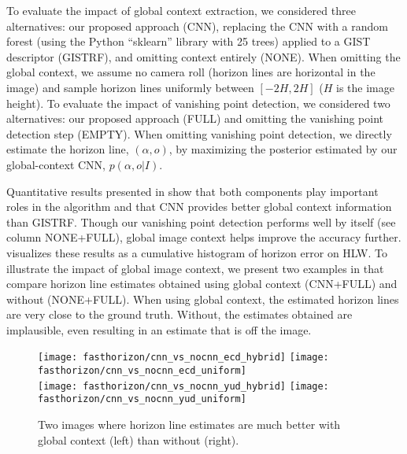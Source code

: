 To evaluate the impact of global context extraction, we considered
three alternatives: our proposed approach (CNN), replacing the CNN
with a random forest (using the Python ``sklearn'' library with 25 trees) applied to a GIST~\cite{oliva2001modeling}
descriptor (GISTRF), and omitting context entirely
(NONE). When omitting the global context, we assume no camera
roll (horizon lines are horizontal in the image) and sample horizon
lines uniformly between $[-2H,2H]$ ($H$ is the image height).  To
evaluate the impact of vanishing point detection, we considered two
alternatives: our proposed approach (FULL) and omitting the vanishing
point detection step (EMPTY). When omitting vanishing point detection,
we directly estimate the horizon line, $(\alpha, o)$, by maximizing
the posterior estimated by our global-context CNN, $p(\alpha, o | I)$.

Quantitative results presented in  show that both
components play important roles in the algorithm and that CNN provides
better global context information than GISTRF.  Though our vanishing
point detection performs well by itself (see column NONE+FULL), global
image context helps improve the accuracy further. 
visualizes these results as a cumulative histogram of horizon error
on HLW.  To illustrate the impact of global image context, we present
two examples in  that compare horizon line
estimates obtained using global context (CNN+FULL) and without
(NONE+FULL).  When using global context, the estimated horizon lines
are very close to the ground truth.  Without, the estimates obtained
are implausible, even resulting in an estimate that is off the image.

\begin{figure}
  \centering
  \texttt{[image: fasthorizon/cnn\_vs\_nocnn\_ecd\_hybrid]}
  \texttt{[image: fasthorizon/cnn\_vs\_nocnn\_ecd\_uniform]}
  \\
  \texttt{[image: fasthorizon/cnn\_vs\_nocnn\_yud\_hybrid]}
  \texttt{[image: fasthorizon/cnn\_vs\_nocnn\_yud\_uniform]}
  \caption{Two images where horizon line estimates are much better with global context (left) than without (right).}
  \label{fig:iscontext}
\end{figure}

